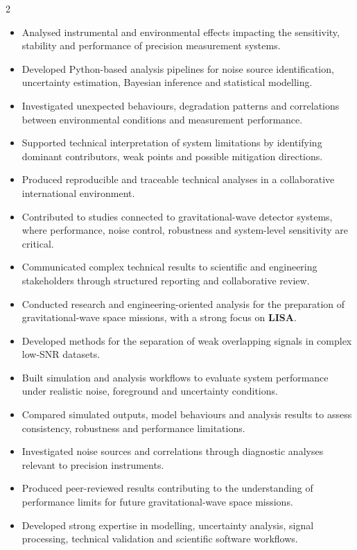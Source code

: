 \documentclass[8pt,a4paper,ragged2e,withhyper]{altacv}
\begin{document}
\begin{paracol}{2}
\begin{itemize}
\item Analysed instrumental and environmental effects impacting the sensitivity, stability and performance of precision measurement systems.
\item Developed Python-based analysis pipelines for noise source identification, uncertainty estimation, Bayesian inference and statistical modelling.
\item Investigated unexpected behaviours, degradation patterns and correlations between environmental conditions and measurement performance.
\item Supported technical interpretation of system limitations by identifying dominant contributors, weak points and possible mitigation directions.
\item Produced reproducible and traceable technical analyses in a collaborative international environment.
\item Contributed to studies connected to gravitational-wave detector systems, where performance, noise control, robustness and system-level sensitivity are critical.
\item Communicated complex technical results to scientific and engineering stakeholders through structured reporting and collaborative review.
\end{itemize}

\divider


\begin{itemize}
\item Conducted research and engineering-oriented analysis for the preparation of gravitational-wave space missions, with a strong focus on \textbf{LISA}.
\item Developed methods for the separation of weak overlapping signals in complex low-SNR datasets.
\item Built simulation and analysis workflows to evaluate system performance under realistic noise, foreground and uncertainty conditions.
\item Compared simulated outputs, model behaviours and analysis results to assess consistency, robustness and performance limitations.
\item Investigated noise sources and correlations through diagnostic analyses relevant to precision instruments.
\item Produced peer-reviewed results contributing to the understanding of performance limits for future gravitational-wave space missions.
\item Developed strong expertise in modelling, uncertainty analysis, signal processing, technical validation and scientific software workflows.
\end{itemize}


\end{paracol}
\end{document}
